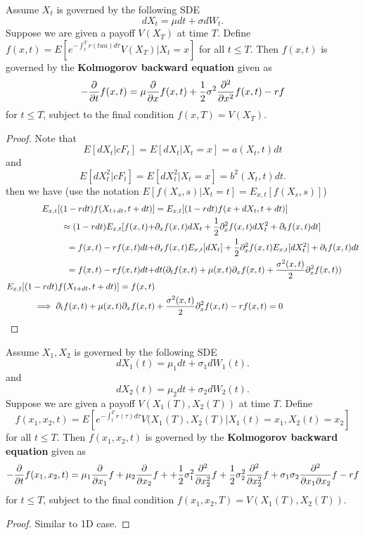 \begin{refsection}
\begin{theorem}
	Assume $X_t$ is governed by the following SDE
	$$dX_t = \mu dt + \sigma dW_t. $$
	Suppose we are given a payoff $V(X_T)$ at time $T$. Define $f(x,t) = E[e^{-\int_t^T r(tau) d\tau}V(X_T)|X_t = x]$ for all $t\leq T$. Then $f(x,t)$ is governed by the \textbf{Kolmogorov backward equation} given as
	$$-\frac{\partial }{\partial t} f(x,t) = \mu \frac{\partial}{\partial x} f(x,t) + \frac{1}{2}\sigma^2 \frac{\partial^2}{\partial x^2} f(x,t) - rf$$
	for $t \leq T$, subject to the final condition $f(x,T) = V(X_T)$.
\end{theorem}
\begin{proof}
	Note that
	$$E[dX_t|cF_t] = E[dX_t|X_t=x] = a(X_t,t)dt$$
	and
	$$E[dX_t^2|cF_t] = E[dX_t^2|X_t=x] = b^2(X_t,t)dt.$$
	then we have
	(use the notation $E[f(X_s,s)|X_t = t] = E_{x,t}[f(X_s,s)]$)
	\begin{align*}
	E_{x,t}[(1 - rdt)f(X_{t+dt},t+dt)] &= E_{x,t}[(1-rdt)f(x + dX_t, t+dt)]\\
	\approx (1-rdt)E_{x,t}[f(x,t) + &\partial_x f(x,t)dX_t + \frac{1}{2}\partial_x^2 f(x,t)dX_t^2 + \partial_t f(x,t)dt]\\
	= f(x,t) -rf(x,t)dt + &\partial_x f(x,t) E_{x,t}[dX_t] + \frac{1}{2}\partial_x^2 f(x,t) E_{x,t}[dX_t^2] + \partial_t f(x,t) dt \\
	= f(x,t) -rf(x,t)dt+ &dt(\partial_t f(x,t) + \mu(x,t)\partial_x f(x,t) + \frac{\sigma^2(x,t)}{2} \partial_x^2 f(x,t))\\
	E_{x,t}[(1-rdt)f(X_{t+dt},t+dt)] = f(x,t) \\
	\implies  \partial_t f(x,t) + \mu(x,t)\partial_x f(x,t)& + \frac{\sigma^2(x,t)}{2} \partial_x^2 f(x,t) -rf(x,t)= 0
	\end{align*}
\end{proof}

\begin{theorem}
	Assume $X_1,X_2$ is governed by the following SDE
	$$dX_1(t) = \mu_1 dt + \sigma_1 dW_1(t). $$
	and
	$$dX_2(t) = \mu_2 dt + \sigma_2 dW_2(t). $$
	Suppose we are given a payoff $V(X_1(T),X_2(T))$ at time $T$. Define $$f(x_1,x_2,t) = E[e^{-\int_t^T r(\tau) d\tau}V(X_1(T),X_2(T)|X_1(t) = x_1,X_2(t)=x_2]$$
	for all $t\leq T$. Then $f(x_1,x_2,t)$ is governed by the \textbf{Kolmogorov backward equation} given as
	$$-\frac{\partial }{\partial t} f(x_1,x_2,t) = \mu_1 \frac{\partial}{\partial x_1} f +\mu_2\frac{\partial}{\partial x_2} f + + \frac{1}{2}\sigma^2_1 \frac{\partial^2}{\partial x^2_2} f + \frac{1}{2}\sigma^2_2 \frac{\partial^2}{\partial x^2_2} f+\sigma_1\sigma_2 \frac{\partial^2}{\partial x_1\partial x_2} f- rf$$
	for $t \leq T$, subject to the final condition $f(x_1,x_2,T) = V(X_1(T),X_2(T))$.
\end{theorem}
\begin{proof}
	Similar to 1D case.
\end{proof}




\end{refsection}
